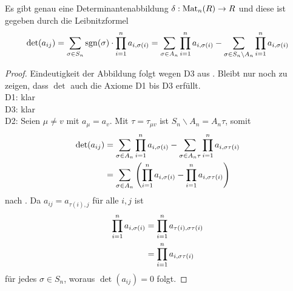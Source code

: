 \begin{theorem}
	Es gibt genau eine Determinantenabbildung $\delta:\operatorname{Mat}_n(R)\to R$ und diese ist gegeben durch die 
	Leibnitzformel 
	\begin{align}
		\det(a_{ij})=\sum_{\sigma\in S_n} \operatorname{sgn}(\sigma)\cdot \prod_{i=1}^n a_{i,\sigma(i)} = \sum_{\sigma
			\in A_n}\prod_{i=1}^n a_{i,\sigma(i)} - \sum_{\sigma\in S_n\backslash A_n}\prod_{i=1}^n a_{i,\sigma(i)}\notag
	\end{align}
\end{theorem}
\begin{proof}
	Eindeutigkeit der Abbildung folgt wegen D3 aus . Bleibt nur noch zu zeigen, dass $\det$ auch die Axiome D1 bis D3 erfüllt. \\
	D1: klar \\
	D3: klar \\
	D2: Seien $\mu\neq v$ mit $a_{\mu}=a_v$. Mit $\tau=\tau_{\mu v}$ ist $S_n\backslash A_n = A_n\tau$, somit 
	\begin{align}
		\det(a_{ij})&=
		\sum_{\sigma\in A_n} \prod_{i=1}^n a_{i,\sigma(i)}-\sum_{\sigma\in A_n\tau} \prod_{i=1}^n a_{i,\sigma\tau(i)} \notag \\
		&=
		\sum_{\sigma\in A_n} \left( \prod_{i=1}^n a_{i,\sigma(i)} - \prod_{i=1}^n a_{i,\sigma\tau(i)} \right) \notag
	\end{align}
	nach . Da $a_{ij}=a_{\tau(i),j}$ 
	für alle $i,j$ ist 
	\begin{align}
		\prod_{i=1}^n a_{i,\sigma(i)}&=\prod_{i=1}^n a_{\tau(i),\sigma\tau(i)} \notag \\
		&=\prod_{i=1}^n a_{i,\sigma\tau(i)} \notag
	\end{align}
	für jedes $\sigma\in S_n$, woraus $\det(a_{ij})=0$ folgt.
\end{proof}

